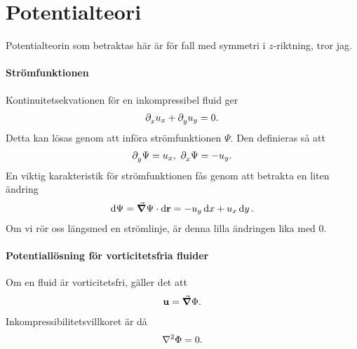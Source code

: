 \section{Potentialteori}
Potentialteorin som betraktas här är för fall med symmetri i $z$-riktning, tror jag.

\paragraph{Strömfunktionen}
Kontinuitetsekvationen för en inkompressibel fluid ger
\begin{align*}
	\partial_{x}^{}u_{x} + \partial_{y}^{}u_{y} = 0.
\end{align*}
Detta kan lösas genom att införa strömfunktionen $\Psi$. Den definieras så att
\begin{align*}
	\partial_{y}^{}\Psi = u_{x},\ \partial_{x}^{}\Psi = -u_{y}.
\end{align*}
En viktig karakteristik för strömfunktionen fås genom att betrakta en liten ändring
\begin{align*}
	\dd{\Psi} = \grad{\Psi}\cdot\dd{\vb{r}} = -u_{y}\dd{x} + u_{x}\dd{y}.
\end{align*}
Om vi rör oss längsmed en strömlinje, är denna lilla ändringen lika med $0$.

\paragraph{Potentiallösning för vorticitetsfria fluider}
Om en fluid är vorticitetsfri, gäller det att
\begin{align*}
	\vb{u} = \grad{\Phi}.
\end{align*}
Inkompressibilitetsvillkoret är då
\begin{align*}
	\laplacian{\Phi} = 0.
\end{align*}

